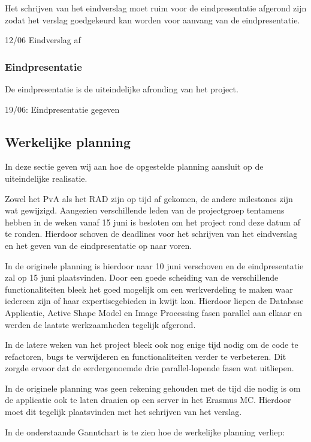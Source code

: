 Het schrijven van het eindverslag moet ruim voor de eindpresentatie afgerond
zijn zodat het verslag goedgekeurd kan worden voor aanvang van de eindpresentatie.

12/06 Eindverslag af

\subsubsection{Eindpresentatie}

De eindpresentatie is de uiteindelijke afronding van het project.

19/06: Eindpresentatie gegeven

\subsection{Werkelijke planning}
\label{werkelijke_planning}

In deze sectie geven wij aan hoe de opgestelde planning aansluit op de
uiteindelijke realisatie.

Zowel het PvA als het RAD zijn op tijd af gekomen, de andere milestones zijn
wat gewijzigd. Aangezien verschillende leden van de projectgroep tentamens
hebben in de weken vanaf 15 juni is besloten om het project rond deze datum af
te ronden. Hierdoor schoven de deadlines voor het schrijven van het eindverslag
en het geven van de eindpresentatie op naar voren.

In de originele planning is hierdoor naar 10 juni verschoven en de
eindpresentatie zal op 15 juni plaatsvinden.  Door een goede scheiding van de
verschillende functionaliteiten bleek het goed mogelijk om een werkverdeling te
maken waar iedereen zijn of haar expertisegebieden in kwijt kon. Hierdoor
liepen de Database Applicatie, Active Shape Model en Image Processing fasen
parallel aan elkaar en werden de laatste werkzaamheden tegelijk afgerond.

In de latere weken van het project bleek ook nog enige tijd nodig om de code te
refactoren, bugs te verwijderen en functionaliteiten verder te verbeteren. Dit
zorgde ervoor dat de eerdergenoemde drie parallel-lopende fasen wat uitliepen.

In de originele planning was geen rekening gehouden met de tijd die nodig is om
de applicatie ook te laten draaien op een server in het Erasmus MC. Hierdoor
moet dit tegelijk plaatsvinden met het schrijven van het verslag.

In de onderstaande Ganntchart is te zien hoe de werkelijke planning verliep:
